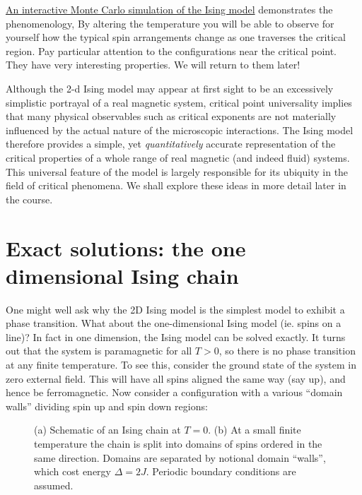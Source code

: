 \documentclass[
  letterpaper,
  DIV=11,
  numbers=noendperiod]{scrreprt}
\begin{document}
\href{https://physics.weber.edu/schroeder/software/demos/isingmodel.html}{An
interactive Monte Carlo simulation of the Ising model} demonstrates the
phenomenology, By altering the temperature you will be able to observe
for yourself how the typical spin arrangements change as one traverses
the critical region. Pay particular attention to the configurations near
the critical point. They have very interesting properties. We will
return to them later!

Although the 2-d Ising model may appear at first sight to be an
excessively simplistic portrayal of a real magnetic system, critical
point universality implies that many physical observables such as
critical exponents are not materially influenced by the actual nature of
the microscopic interactions. The Ising model therefore provides a
simple, yet \emph{quantitatively} accurate representation of the
critical properties of a whole range of real magnetic (and indeed fluid)
systems. This universal feature of the model is largely responsible for
its ubiquity in the field of critical phenomena. We shall explore these
ideas in more detail later in the course.

\section{Exact solutions: the one dimensional Ising
chain}\label{exact-solutions-the-one-dimensional-ising-chain}

One might well ask why the 2D Ising model is the simplest model to
exhibit a phase transition. What about the one-dimensional Ising model
(ie. spins on a line)? In fact in one dimension, the Ising model can be
solved exactly. It turns out that the system is paramagnetic for all
\(T>0\), so there is no phase transition at any finite temperature. To
see this, consider the ground state of the system in zero external
field. This will have all spins aligned the same way (say up), and hence
be ferromagnetic. Now consider a configuration with a various ``domain
walls'' dividing spin up and spin down regions:

\begin{figure}


\caption{\label{fig-isingchain}(a) Schematic of an Ising chain at
\(T=0\). (b) At a small finite temperature the chain is split into
domains of spins ordered in the same direction. Domains are separated by
notional domain ``walls'', which cost energy \(\Delta=2J\). Periodic
boundary conditions are assumed.}

\end{figure}%
\end{document}

